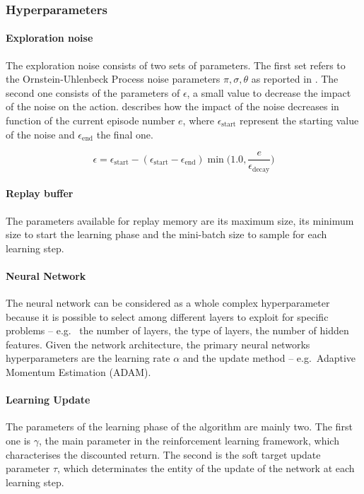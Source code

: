 \subsubsection{Hyperparameters} \label{hpddpg}

\paragraph{Exploration noise} The exploration noise consists of two sets of parameters. The first set refers to the Ornstein-Uhlenbeck Process noise parameters $\pi, \sigma, \theta$ as reported in \cite{uhlenbeck1930theory}. The second one consists of the parameters of $\epsilon$, a small value to decrease the impact of the noise on the action.  describes how the impact of the noise decreases in function of the current episode number $e$, where $\epsilon_{\text{start}}$ represent the starting value of the noise and $\epsilon_{\text{end}}$ the final one.

\begin{equation} \label{eq:epsilon}
	\epsilon = \epsilon_{\text{start}} - (\epsilon_{\text{start}} -\epsilon_{\text{end}}) \min\Bigg(1.0, \frac{e}{\epsilon_{\text{decay}}}\Bigg)
\end{equation}

\paragraph{Replay buffer} The parameters available for replay memory are its maximum size, its minimum size to start the learning phase and the mini-batch size to sample for each learning step.

\paragraph{Neural Network} The neural network can be considered as a whole complex hyperparameter because it is possible to select among different layers to exploit for specific problems -- e.g. \ the number of layers, the type of layers, the number of hidden features. Given the network architecture, the primary neural networks hyperparameters are the learning rate $\alpha$ and the update method -- e.g.\ Adaptive Momentum Estimation (ADAM).

\paragraph{Learning Update} The parameters of the learning phase of the algorithm are mainly two. The first one is $\gamma$, the main parameter in the reinforcement learning framework, which characterises the discounted return. The second is the soft target update parameter $\tau$, which determinates the entity of the update of the network at each learning step.

